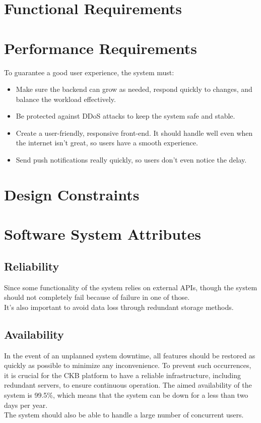 {\color{red} \section{Functional Requirements}}

\section{Performance Requirements}
To guarantee a good user experience, the system must:

\begin{itemize}
    \item Make sure the backend can grow as needed, respond quickly to changes, and balance the workload effectively.
    \item Be protected against DDoS attacks to keep the system safe and stable.
    \item Create a user-friendly, responsive front-end. It should handle well even when the internet isn't great, so users have a smooth experience.
    \item Send push notifications really quickly, so users don't even notice the delay.
\end{itemize}

{\color{red}\section{Design Constraints}}

\section{Software System Attributes}
\subsection{Reliability}
Since some functionality of the system relies on external APIs, though the system should not completely fail because of failure in one of those.\\
It's also important to avoid data loss through redundant storage methods.

\subsection{Availability}
In the event of an unplanned system downtime, all features should be restored as quickly as possible to minimize any inconvenience. To prevent such occurrences, it is crucial for the CKB platform to have a reliable infrastructure, including redundant servers, to ensure continuous operation.
The aimed availability of the system is 99.5\%, which means that the system can be down for a less than two days per year.\\
The system should also be able to handle a large number of concurrent users.

